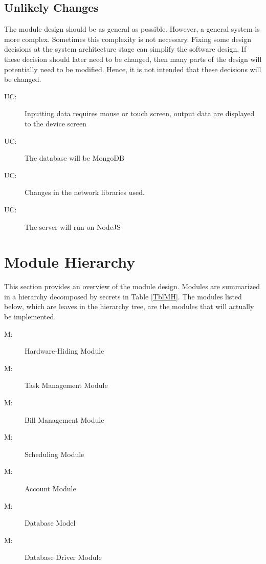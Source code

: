 \documentclass[12pt, titlepage]{article}
\newcounter{ucnum}
\newcommand{\uctheucnum}{UC\theucnum}
\newcounter{mnum}
\newcommand{\mthemnum}{M\themnum}
\begin{document}
\subsection{Unlikely Changes} \label{SecUchange}

The module design should be as general as possible. However, a general system is more complex. Sometimes this complexity is not necessary. Fixing some design
decisions at the system architecture stage can simplify the software design. If these decision should later need to be changed, then many parts of the design will potentially need to be modified. Hence, it is not intended that these decisions will be changed.

\begin{description}
\item[ \uctheucnum \label{ucIO}:] Inputting data requires mouse or touch screen, output data are displayed to the device screen
\item[ \uctheucnum \label{ucDatabase}:] The database will be MongoDB
\item[ \uctheucnum \label{ucNetwork}:] Changes in the network libraries used.
\item[ \uctheucnum \label{ucServer}:] The server will run on NodeJS
\end{description}

\section{Module Hierarchy} \label{SecMH}

This section provides an overview of the module design. Modules are summarized
in a hierarchy decomposed by secrets in Table \ref{TblMH}. The modules listed
below, which are leaves in the hierarchy tree, are the modules that will
actually be implemented.

\begin{description}
\item [ \mthemnum \label{mHH}:] Hardware-Hiding Module
\item [ \mthemnum \label{mT}:] Task Management Module
\item [ \mthemnum \label{mB}:] Bill Management Module
\item [ \mthemnum \label{mS}:] Scheduling Module
\item [ \mthemnum \label{mA}:] Account Module
\item [ \mthemnum \label{mDM}:] Database Model
\item [ \mthemnum \label{mD}:] Database Driver Module
\end{description}
\end{document}
